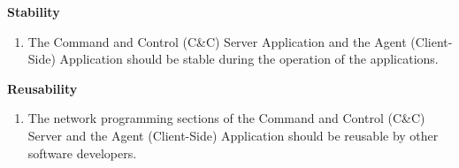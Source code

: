 \noindent
\textbf{Stability}

\begin{enumerate}
    \item The Command and Control (C\&C) Server Application and the Agent (Client-Side) Application should
          be stable during the operation of the applications.
\end{enumerate}

\noindent
\textbf{Reusability}

\begin{enumerate}
    \item The network programming sections of the Command and Control (C\&C) Server and the Agent
          (Client-Side) Application should be reusable by other software developers.
\end{enumerate}